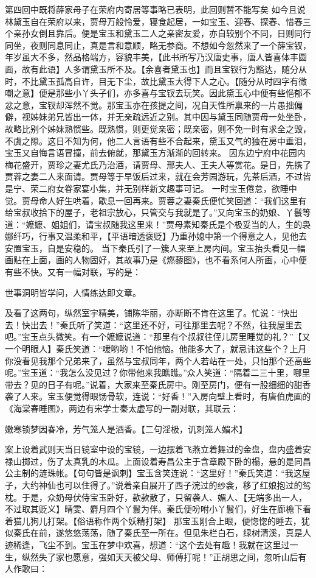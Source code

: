 \documentclass[12pt,oneside]{book}
\begin{document}
第四回中既将薛家母子在荣府内寄居等事略已表明，此回则暂不能写矣
如今且说林黛玉自在荣府以来，贾母万般怜爱，寝食起居，一如宝玉、迎春、探春、惜春三个亲孙女倒且靠后。便是宝玉和黛玉二人之亲密友爱，亦自较别个不同，日则同行同坐，夜则同息同止，真是言和意顺，略无参商。不想如今忽然来了一个薛宝钗，年岁虽大不多，然品格端方，容貌丰美，【此书所写乃汉唐史事，唐人皆喜体丰圆面，故有此语】人多谓黛玉所不及。【余喜者黛玉也】而且宝钗行为豁达，随分从时，不比黛玉孤高自许，目无下尘，故比黛玉大得下人之心。【随分从时四字有微嘲之意】便是那些小丫头子们，亦多喜与宝钗去玩笑。因此黛玉心中便有些悒郁不忿之意，宝钗却浑然不觉。那宝玉亦在孩提之间，况自天性所禀来的一片愚拙偏僻，视姊妹弟兄皆出一体，并无亲疏远近之别。其中因与黛玉同随贾母一处坐卧，故略比别个姊妹熟惯些。既熟惯，则更觉亲密；既亲密，则不免一时有求全之毁，不虞之隙。这日不知为何，他二人言语有些不合起来，黛玉又气的独在房中垂泪，宝玉又自悔言语冒撞，前去俯就，那黛玉方渐渐的回转来。
因东边宁府中花园内梅花盛开，贾珍之妻尤氏乃治酒，请贾母、邢夫人、王夫人等赏花。是日，先携了贾蓉之妻二人来面请。贾母等于早饭后过来，就在会芳园游玩，先茶后酒，不过皆是宁、荣二府女眷家宴小集，并无别样新文趣事可记。
一时宝玉倦怠，欲睡中觉。贾母命人好生哄着，歇息一回再来。贾蓉之妻秦氏便忙笑回道：“我们这里有给宝叔收拾下的屋子，老祖宗放心，只管交与我就是了。”又向宝玉的奶娘、丫鬟等道：“嬷嬷、姐姐们，请宝叔随我这里来！”贾母素知秦氏是个极妥当的人，生的袅娜纤巧，行事又温柔和平，【平语暗透褒贬】乃重孙媳中第一个得意之人，见他去安置宝玉，自是安稳的。
当下秦氏引了一簇人来至上房内间。宝玉抬头看见一幅画贴在上面，画的人物固好，其故事乃是《燃藜图》，也不看系何人所画，心中便有些不快。又有一幅对联，写的是：

世事洞明皆学问，人情练达即文章。

及看了这两句，纵然室宇精美，铺陈华丽，亦断断不肯在这里了。忙说：“快出去！快出去！”秦氏听了笑道：“这里还不好，可往那里去呢？不然，往我屋里去吧。”宝玉点头微笑。有一个嬷嬷说道：“那里有个叔叔往侄儿房里睡觉的礼？”【又一个明眼人】秦氏笑道：“嗳哟哟！不怕他恼。他能多大了，就忌讳这些个？上月你没看见我那个兄弟来了，虽然与宝叔同年，两个人若站在一处，只怕那个还高些呢。”宝玉道：“我怎么没见过？你带他来我瞧瞧。”众人笑道：“隔着二三十里，哪里带去？见的日子有呢。”说着，大家来至秦氏房中。刚至房门，便有一股细细的甜香袭了人来。宝玉便觉得眼饧骨软，连说：“好香！”入房向壁上看时，有唐伯虎画的《海棠春睡图》，两边有宋学士秦太虚写的一副对联，其联云：

嫩寒锁梦因春冷，芳气笼人是酒香。【二句淫极，讥刺笼人媚术】

案上设着武则天当日镜室中设的宝镜，一边摆着飞燕立着舞过的金盘，盘内盛着安禄山掷过，伤了太真乳的木瓜。上面设着寿昌公主于含章殿下卧的榻，悬的是同昌公主制的涟珠帐。【句句皆是讽刺】宝玉含笑连说：“这里好！”秦氏笑道：“我这屋子，大约神仙也可以住得了。”说着亲自展开了西子浣过的纱衾，移了红娘抱过的鸳枕。于是，众奶母伏侍宝玉卧好，款款散了，只留袭人、媚人、【无端多出一人，不过取其贬义】晴雯、麝月四个丫鬟为伴。秦氏便吩咐小丫鬟们，好生在廊檐下看着猫儿狗儿打架。【俗语称作两个妖精打架】
那宝玉刚合上眼，便惚惚的睡去，犹似秦氏在前，遂悠悠荡荡，随了秦氏至一所在。但见朱栏白石，绿树清溪，真是人迹稀逢，飞尘不到。宝玉在梦中欢喜，想道：“这个去处有趣！我就在这里过一生，纵然失了家也愿意，强如天天被父母、师傅打呢！”正胡思之间，忽听山后有人作歌曰：
\end{document}

